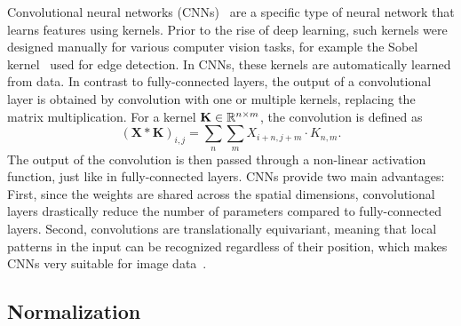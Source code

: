 Convolutional neural networks (CNNs)~\cite{CNN} are a specific type of neural network that learns features using
kernels.
Prior to the rise of deep learning, such kernels were designed manually for various computer vision tasks, for example
the Sobel kernel~\cite{Sobel} used for edge detection.
In CNNs, these kernels are automatically learned from data. In contrast to fully-connected layers, the output of a
convolutional layer is obtained by convolution with one or multiple kernels, replacing the matrix multiplication.
For a kernel $\mathbf{K} \in \mathbb{R}^{n \times m}$, the convolution is defined as
\begin{equation}
    (\mathbf{X} \ast \mathbf{K})_{i,j} = \sum_{n}\sum_{m} X_{i+n,j+m} \cdot K_{n,m}.
\end{equation}
The output of the convolution is then passed through a non-linear activation function, just like in fully-connected
layers.
CNNs provide two main advantages: First, since the weights are shared across the spatial dimensions, convolutional
layers drastically reduce the number of parameters compared to fully-connected layers. 
Second, convolutions are translationally equivariant, meaning that local patterns in the input can be recognized 
regardless of their position, which makes CNNs very suitable for image data~\cite{DeepLearning}.

\subsection{Normalization}

\newcommand{\cube}[2]{
    \fill[gray!10, opacity=0.5] (0,0,\a) -- (\a,0,\a) -- (\a,\a,\a) -- (0,\a,\a) -- cycle;
    \fill[gray!10, opacity=0.5] (0,0,0) -- (\a,0,0) -- (\a,0,\a) -- (0,0,\a) -- cycle;
    \fill[gray!10, opacity=0.5] (0,0,0) -- (0,\a,0) -- (0,\a,\a) -- (0,0,\a) -- cycle;

    \draw[thick] (0,#1,0) -- (0,0,0) -- (#1,0,0);
    \draw[thick] (0,#1,0) -- (0,#1,#1);
    \draw[thick] (0,0,0) -- (0,0,#1);
    \draw[thick] (#1,0,0) -- (#1,0,#1);
    \draw[thick] (0,#1,#1) -- (0,0,#1) -- (#1,0,#1) -- (#1,#1,#1) -- cycle;

    \foreach \i in {1,2,...,#1} {
        \draw[very thin] (0,\i,0) -- (0,\i,#1);
        \draw[very thin] (0,0,\i) -- (0,#1,\i);

        \draw[very thin] (\i,0,0) -- (\i,0,#1);
        \draw[very thin] (0,0,\i) -- (#1,0,\i);

        \draw[very thin] (\i,0,#1) -- (\i,#1,#1);
        \draw[very thin] (0,\i,#1) -- (#1,\i,#1);
    }

    \node[rotate=90] at (0,#1,#1/2) [above] {$H,W$};
    \node at (0,#1/2,0) [below left] {$C$};
    \node at (#1/2,0,0) [below right] {$N$};

    \node at (#1,#1,#1+1) {#2};
}

